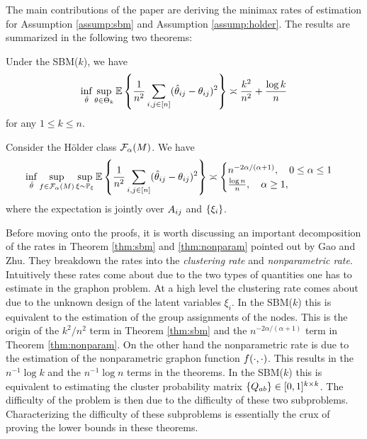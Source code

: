 \documentclass[11pt]{article}
\begin{document}
The main contributions of the paper are deriving the minimax rates of estimation for Assumption \ref{assump:sbm} and Assumption \ref{assump:holder}. The results are summarized in the following two theorems:

\begin{theorem} \label{thm:sbm}
Under the SBM($k$), we have
\begin{equation}
\inf_{\hat{\theta}} \sup_{\theta \in \Theta_k} \mathbb{E}\left\{\frac{1}{n^2} \sum_{i,j \in \lbrack n\rbrack} (\hat{\theta}_{ij} - \theta_{ij})^2\right\} \asymp \frac{k^2}{n^2} + \frac{\log k}{n}
\end{equation}
for any $1 \leq k \leq n$.
\end{theorem}

\begin{theorem}\label{thm:nonparam}
Consider the H\"older class $\mathcal{F}_{\alpha}(M)$. We have
\begin{equation}
\inf_{\hat{\theta}} \sup_{f \in \mathcal{F}_{\alpha}(M)} \sup_{\xi \sim \mathbb{P}_{\xi}}\mathbb{E}\left\{\frac{1}{n^2} \sum_{i,j \in \lbrack n\rbrack} (\hat{\theta}_{ij} - \theta_{ij})^2\right\} \asymp
\begin{cases}
n^{-2\alpha/(\alpha + 1)}, \quad 0 \leq \alpha \leq 1 \\
\frac{\log n}{n}, \quad \alpha \geq 1,
\end{cases}
\end{equation}
where the expectation is jointly over $A_{ij}$ and $\{\xi_i\}$.
\end{theorem}

Before moving onto the proofs, it is worth discussing an important decomposition of the rates in Theorem \ref{thm:sbm} and \ref{thm:nonparam} pointed out by Gao and Zhu. They breakdown the rates into the \textit{clustering rate} and \textit{nonparametric rate}. Intuitively these rates come about due to the two types of quantities one has to estimate in the graphon problem. At a high level the clustering rate comes about due to the unknown design of the latent variables $\xi_i$. In the SBM($k$) this is equivalent to the estimation of the group assignments of the nodes. This is the origin of the $k^2/n^2$ term in Theorem \ref{thm:sbm} and the $n^{-2\alpha/(\alpha + 1)}$ term in Theorem \ref{thm:nonparam}. On the other hand the nonparametric rate is due to the estimation of the nonparametric graphon function $f(\cdot, \cdot)$. This results in the $n^{-1} \log k$ and the $n^{-1} \log n$ terms in the theorems. In the SBM($k$) this is equivalent to estimating the cluster probability matrix $\{Q_{ab}\} \in [0, 1]^{k \times k}$. The difficulty of the problem is then due to the difficulty of these two subproblems. Characterizing the difficulty of these subproblems is essentially the crux of proving the lower bounds in these theorems.
\end{document}

